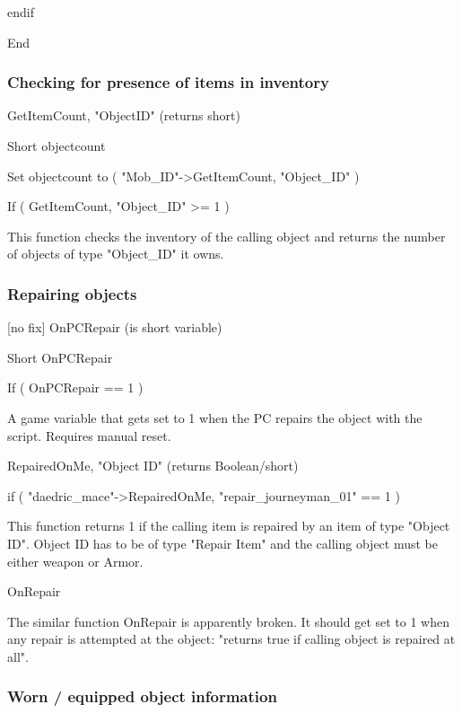 \documentclass[
]{article}
\begin{document}
endif

End

\hypertarget{checking-for-presence-of-items-in-inventory}{%
\subsubsection{Checking for presence of items in
inventory}\label{checking-for-presence-of-items-in-inventory}}

GetItemCount, "ObjectID" (returns short)

Short objectcount

Set objectcount to ( "Mob\_ID"-\textgreater GetItemCount, "Object\_ID" )

If ( GetItemCount, "Object\_ID" \textgreater= 1 )

This function checks the inventory of the calling object and returns the
number of objects of type "Object\_ID" it owns.

\hypertarget{section-1}{%
\subsubsection{}\label{section-1}}

\hypertarget{repairing-objects}{%
\subsubsection{Repairing objects}\label{repairing-objects}}

{[}no fix{]} OnPCRepair (is short variable)

Short OnPCRepair

If ( OnPCRepair == 1 )

A game variable that gets set to 1 when the PC repairs the object with
the script. Requires manual reset.

RepairedOnMe, "Object ID" (returns Boolean/short)

if ( "daedric\_mace"-\textgreater RepairedOnMe, "repair\_journeyman\_01"
== 1 )

This function returns 1 if the calling item is repaired by an item of
type "Object ID". Object ID has to be of type "Repair Item" and the
calling object must be either weapon or Armor.

OnRepair

The similar function OnRepair is apparently broken. It should get set to
1 when any repair is attempted at the object: "returns true if calling
object is repaired at all".

\hypertarget{worn-equipped-object-information}{%
\subsubsection{Worn / equipped object
information}\label{worn-equipped-object-information}}
\end{document}
